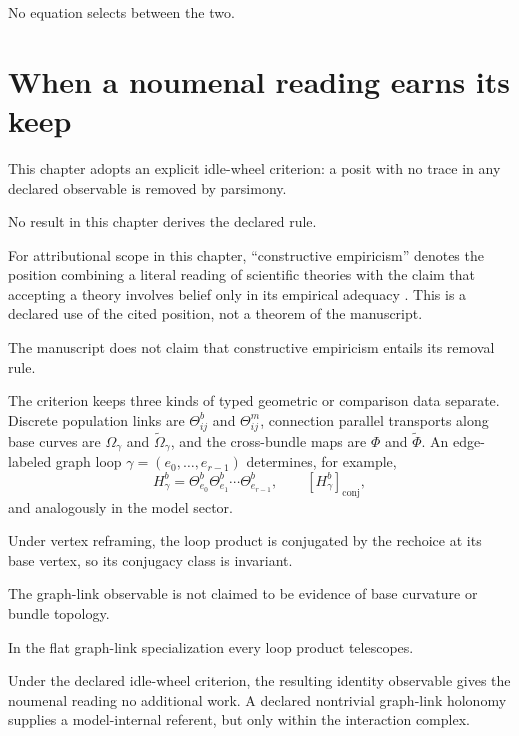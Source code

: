 No equation selects between the two. 

\section{When a noumenal reading earns its keep}
\label{sec:phil-noumenon}

This chapter adopts an explicit idle-wheel criterion: a posit with no trace
in any declared observable is removed by parsimony. 

No result in this chapter derives the declared rule. 

For attributional scope in this chapter, ``constructive empiricism'' denotes
the position combining a literal reading of scientific theories with the
claim that accepting a theory involves belief only in its empirical adequacy
\citep[11--12]{vanFraassen1980}. This is a declared use of the cited position,
not a theorem of the manuscript. 

The manuscript does not claim that constructive empiricism entails its
removal rule. 

The criterion keeps three kinds of typed geometric or comparison data
separate.  Discrete
population links are \(\Theta^b_{ij}\) and \(\Theta^m_{ij}\), connection
parallel transports along base curves are
\(\Omega_\gamma\) and \(\widetilde\Omega_\gamma\), and the cross-bundle maps are
\(\Phi\) and \(\widetilde\Phi\).  An edge-labeled graph loop
\(\gamma=(e_0,\ldots,e_{r-1})\) determines, for
example,
\begin{equation}
H_\gamma^b
=\Theta^b_{e_0}\Theta^b_{e_1}\cdots\Theta^b_{e_{r-1}},
\qquad
[H_\gamma^b]_{\mathrm{conj}},
\label{eq:phil-holonomy}
\end{equation}
and analogously in the model sector. 

Under vertex reframing, the loop product is conjugated by the rechoice at its
base vertex, so its conjugacy class is invariant. 

The graph-link observable is not claimed to be evidence of base curvature or
bundle topology. 

In the flat graph-link specialization every loop product telescopes.

Under the declared idle-wheel criterion, the resulting identity observable
gives the noumenal reading no additional work.  A declared nontrivial
graph-link holonomy supplies a model-internal referent, but only within the
interaction complex. 

